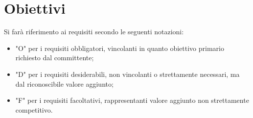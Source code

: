 \section{Obiettivi}

Si farà riferimento ai requisiti secondo le seguenti notazioni:
\begin{itemize}
    \item "O" per i requisiti obbligatori, vincolanti in quanto obiettivo primario richiesto dal committente;
    \item "D" per i requisiti desiderabili, non vincolanti o strettamente necessari, ma dal riconoscibile valore aggiunto;
    \item "F" per i requisiti facoltativi, rappresentanti valore aggiunto non strettamente competitivo.
\end{itemize}

